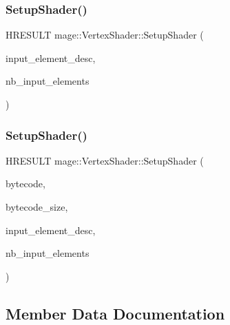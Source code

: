 \subsubsection{\texorpdfstring{Setup\+Shader()}{SetupShader()}\hspace{0.1cm}{\footnotesize\ttfamily [1/2]}}
{\footnotesize\ttfamily H\+R\+E\+S\+U\+LT mage\+::\+Vertex\+Shader\+::\+Setup\+Shader (\begin{DoxyParamCaption}\item[{const D3\+D11\+\_\+\+I\+N\+P\+U\+T\+\_\+\+E\+L\+E\+M\+E\+N\+T\+\_\+\+D\+E\+SC $\ast$}]{input\+\_\+element\+\_\+desc,  }\item[{uint32\+\_\+t}]{nb\+\_\+input\+\_\+elements }\end{DoxyParamCaption})\hspace{0.3cm}{\ttfamily [private]}}

\hypertarget{classmage_1_1_vertex_shader_af096750cfbb86b38f090935bb6e5accd}{}\label{classmage_1_1_vertex_shader_af096750cfbb86b38f090935bb6e5accd} 
\subsubsection{\texorpdfstring{Setup\+Shader()}{SetupShader()}\hspace{0.1cm}{\footnotesize\ttfamily [2/2]}}
{\footnotesize\ttfamily H\+R\+E\+S\+U\+LT mage\+::\+Vertex\+Shader\+::\+Setup\+Shader (\begin{DoxyParamCaption}\item[{const void $\ast$}]{bytecode,  }\item[{S\+I\+Z\+E\+\_\+T}]{bytecode\+\_\+size,  }\item[{const D3\+D11\+\_\+\+I\+N\+P\+U\+T\+\_\+\+E\+L\+E\+M\+E\+N\+T\+\_\+\+D\+E\+SC $\ast$}]{input\+\_\+element\+\_\+desc,  }\item[{uint32\+\_\+t}]{nb\+\_\+input\+\_\+elements }\end{DoxyParamCaption})\hspace{0.3cm}{\ttfamily [private]}}



\subsection{Member Data Documentation}
\hypertarget{classmage_1_1_vertex_shader_a112021bb8067fb4a66870b125403354a}{}\label{classmage_1_1_vertex_shader_a112021bb8067fb4a66870b125403354a} 
